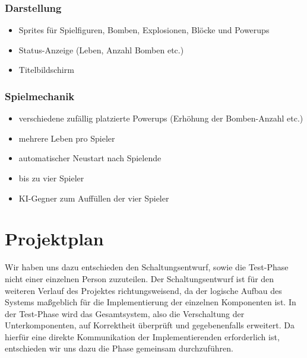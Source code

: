 \documentclass[parskip=full]{scrartcl}
\begin{document}
			\subsubsection{Darstellung}
			\begin{itemize}[noitemsep]
				\item Sprites für Spielfiguren, Bomben, Explosionen, Blöcke und Powerups 
				\item Status-Anzeige (Leben, Anzahl Bomben etc.)
				\item Titelbildschirm
			\end{itemize}
			
			\subsubsection{Spielmechanik}
			\begin{itemize}[noitemsep]
				\item verschiedene zufällig platzierte Powerups (Erhöhung der Bomben-Anzahl etc.)
				\item mehrere Leben pro Spieler
				\item automatischer Neustart nach Spielende
				\item bis zu vier Spieler
				\item KI-Gegner zum Auffüllen der vier Spieler
			\end{itemize}
	\newpage
	\section{Projektplan}
		Wir haben uns dazu entschieden den Schaltungsentwurf, sowie die Test-Phase nicht einer einzelnen Person zuzuteilen. \newline
		Der Schaltungsentwurf ist für den weiteren Verlauf des Projektes richtungsweisend, da der logische Aufbau des Systems maßgeblich für die Implementierung der einzelnen Komponenten ist. \newline
		In der Test-Phase wird das Gesamtsystem, also die Verschaltung der Unterkomponenten, auf Korrektheit überprüft und gegebenenfalls erweitert. Da hierfür eine direkte Kommunikation der Implementierenden erforderlich ist, entschieden wir uns dazu die Phase gemeinsam durchzuführen.
		
\end{document}
